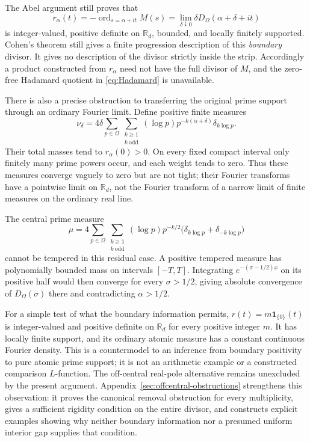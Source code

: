 \documentclass[11pt]{article}
\theoremstyle{definition}
\theoremstyle{remark}
\newcommand{\R}{\mathbb R}
\newcommand{\ord}{\operatorname{ord}}
\newcommand{\one}{\mathbf 1}
\numberwithin{equation}{section}
\begin{document}
The Abel argument still proves that
\[
r_\alpha(t)=-\ord_{s=\alpha+it}M(s)
=\lim_{\delta\downarrow0}\delta D_\Omega(\alpha+\delta+it)
\]
is integer-valued, positive definite on $\R_d$, bounded, and locally finitely supported. Cohen's theorem still gives a finite progression description of this \emph{boundary} divisor. It gives no description of the divisor strictly inside the strip. Accordingly a product constructed from $r_\alpha$ need not have the full divisor of $M$, and the zero-free Hadamard quotient in \eqref{eq:Hadamard} is unavailable.

There is also a precise obstruction to transferring the original prime support through an ordinary Fourier limit. Define positive finite measures
\[
\nu_\delta=4\delta\sum_{p\in\Omega}\sum_{\substack{k\ge1\\k\ \mathrm{odd}}}
(\log p)p^{-k(\alpha+\delta)}\delta_{k\log p}.
\]
Their total masses tend to $r_\alpha(0)>0$. On every fixed compact interval only finitely many prime powers occur, and each weight tends to zero. Thus these measures converge vaguely to zero but are not tight; their Fourier transforms have a pointwise limit on $\R_d$, not the Fourier transform of a narrow limit of finite measures on the ordinary real line.

The central prime measure
\[
\mu=4\sum_{p\in\Omega}\sum_{\substack{k\ge1\\k\ \mathrm{odd}}}
(\log p)p^{-k/2}\bigl(\delta_{k\log p}+\delta_{-k\log p}\bigr)
\]
cannot be tempered in this residual case. A positive tempered measure has polynomially bounded mass on intervals $[-T,T]$. Integrating $e^{-(\sigma-1/2)x}$ on its positive half would then converge for every $\sigma>1/2$, giving absolute convergence of $D_\Omega(\sigma)$ there and contradicting $\alpha>1/2$.

For a simple test of what the boundary information permits, $r(t)=m\one_{\{0\}}(t)$ is integer-valued and positive definite on $\R_d$ for every positive integer $m$. It has locally finite support, and its ordinary atomic measure has a constant continuous Fourier density. This is a countermodel to an inference from boundary positivity to pure atomic prime support; it is not an arithmetic example or a constructed comparison $L$-function. The off-central real-pole alternative remains unexcluded by the present argument. Appendix~\ref{sec:offcentral-obstructions} strengthens this observation: it proves the canonical removal obstruction for every multiplicity, gives a sufficient rigidity condition on the entire divisor, and constructs explicit examples showing why neither boundary information nor a presumed uniform interior gap supplies that condition.
\end{document}
